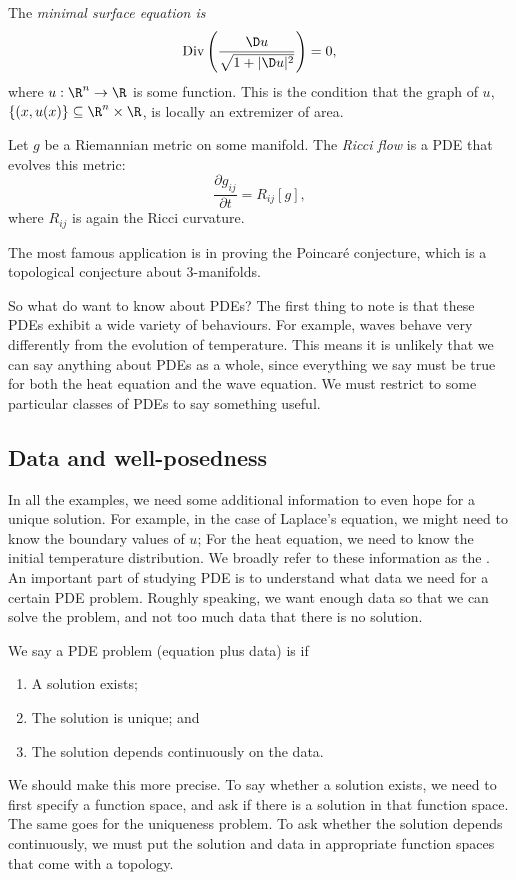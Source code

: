 \documentclass[a4paper]{article}
\begin{document}
\begin{eg}
  The \emph{minimal surface equation is}
  \[
    \mathrm{Div}\left(\frac{\D u}{\sqrt{1 + |\D u|^2}}\right) = 0,
  \]
  where $u: \R^n \to \R$ is some function. This is the condition that the graph of $u$, $\{(x, u(x)\}\subseteq \R^n \times \R$, is locally an extremizer of area.
\end{eg}

\begin{eg}
  Let $g$ be a Riemannian metric on some manifold. The \emph{Ricci flow} is a PDE that evolves this metric:
  \[
    \frac{\partial g_{ij}}{\partial t} = R_{ij}[g],
  \]
  where $R_{ij}$ is again the Ricci curvature.

  The most famous application is in proving the Poincar\'e conjecture, which is a topological conjecture about $3$-manifolds.
\end{eg}

So what do want to know about PDEs? The first thing to note is that these PDEs exhibit a wide variety of behaviours. For example, waves behave very differently from the evolution of temperature. This means it is unlikely that we can say anything about PDEs as a whole, since everything we say must be true for both the heat equation and the wave equation. We must restrict to some particular classes of PDEs to say something useful.

\subsection{Data and well-posedness}
In all the examples, we need some additional information to even hope for a unique solution. For example, in the case of Laplace's equation, we might need to know the boundary values of $u$; For the heat equation, we need to know the initial temperature distribution. We broadly refer to these information as the . An important part of studying PDE is to understand what data we need for a certain PDE problem. Roughly speaking, we want enough data so that we can solve the problem, and not too much data that there is no solution.

\begin{defi}
  We say a PDE problem (equation plus data) is  if
  \begin{enumerate}
    \item A solution exists;
    \item The solution is unique; and
    \item The solution depends continuously on the data.
  \end{enumerate}
\end{defi}
We should make this more precise. To say whether a solution exists, we need to first specify a function space, and ask if there is a solution in that function space. The same goes for the uniqueness problem. To ask whether the solution depends continuously, we must put the solution and data in appropriate function spaces that come with a topology.
\end{document}
